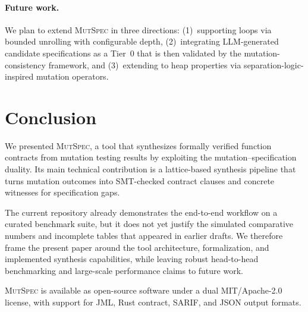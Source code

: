 \documentclass[11pt]{article}
\begin{document}
\paragraph{Future work.}
We plan to extend \textsc{MutSpec} in three directions: (1)~supporting loops
via bounded unrolling with configurable depth, (2)~integrating LLM-generated
candidate specifications as a Tier~0 that is then validated by the
mutation-consistency framework, and (3)~extending to heap properties via
separation-logic-inspired mutation operators.

\section{Conclusion}
\label{sec:conclusion}

We presented \textsc{MutSpec}, a tool that synthesizes formally verified function contracts from mutation testing results by exploiting the mutation--specification duality. Its main technical contribution is a lattice-based synthesis pipeline that turns mutation outcomes into SMT-checked contract clauses and concrete witnesses for specification gaps.

The current repository already demonstrates the end-to-end workflow on a curated benchmark suite, but it does not yet justify the simulated comparative numbers and incomplete tables that appeared in earlier drafts. We therefore frame the present paper around the tool architecture, formalization, and implemented synthesis capabilities, while leaving robust head-to-head benchmarking and large-scale performance claims to future work.

\textsc{MutSpec} is available as open-source software under a dual MIT/Apache-2.0 license, with support for JML, Rust contract, SARIF, and JSON output formats.
\end{document}
